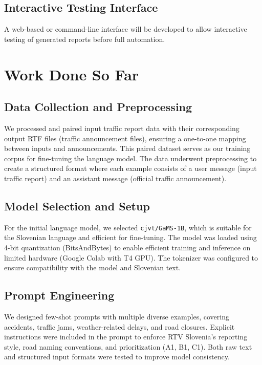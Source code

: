 \documentclass[fleqn,moreauthors,10pt]{ds_report}
\begin{document}
\subsection*{Interactive Testing Interface}

A web-based or command-line interface will be developed to allow interactive testing of generated reports before full automation.

\section*{Work Done So Far}

\subsection*{Data Collection and Preprocessing}

We processed and paired input traffic report data with their corresponding output RTF files (traffic announcement files), ensuring a one-to-one mapping between inputs and announcements. This paired dataset serves as our training corpus for fine-tuning the language model. The data underwent preprocessing to create a structured format where each example consists of a user message (input traffic report) and an assistant message (official traffic announcement).


\subsection*{Model Selection and Setup}
For the initial language model, we selected \texttt{cjvt/GaMS-1B}, which is suitable for the Slovenian language and efficient for fine-tuning. The model was loaded using 4-bit quantization (BitsAndBytes) to enable efficient training and inference on limited hardware (Google Colab with T4 GPU). The tokenizer was configured to ensure compatibility with the model and Slovenian text.

\subsection*{Prompt Engineering}
We designed few-shot prompts with multiple diverse examples, covering accidents, traffic jams, weather-related delays, and road closures. Explicit instructions were included in the prompt to enforce RTV Slovenia’s reporting style, road naming conventions, and prioritization (A1, B1, C1). Both raw text and structured input formats were tested to improve model consistency.
\end{document}
